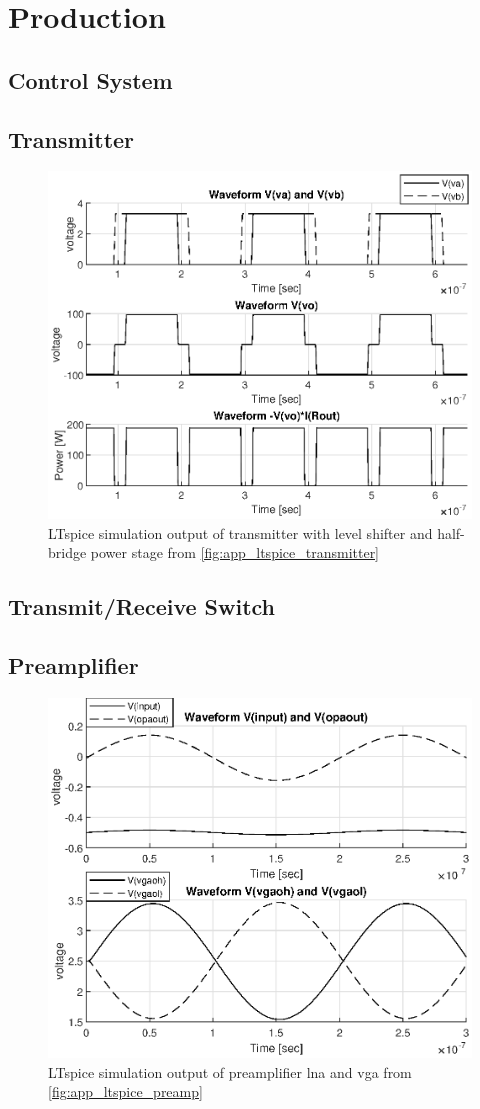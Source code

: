 \chapter{Production}
\section{Control System}

\section{Transmitter}
\begin{figure}[htbp]
	\centering
	\includegraphics[width=.8\textwidth]{Figures/4_transmitter_sim_out.eps}
	\caption{LTspice simulation output of transmitter with level shifter and half-bridge power stage from \cref{fig:app_ltspice_transmitter}}
	\label{fig:4_transmitter_sim}
\end{figure}
\section{Transmit/Receive Switch}
\section{Preamplifier}
\begin{figure}[htbp]
	\centering
	\includegraphics[width=.8\textwidth]{Figures/4_preamplifier_sim_out.eps}
	\caption{LTspice simulation output of preamplifier \gls{lna} and \gls{vga} from \cref{fig:app_ltspice_preamp}}
	\label{fig:4_preamplifier_sim}
\end{figure}
